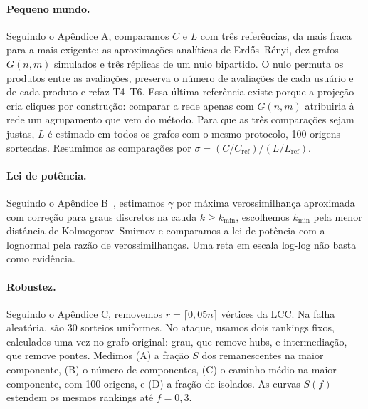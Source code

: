 \documentclass[sigconf,nonacm]{webmedia}
\begin{document}
\paragraph{Pequeno mundo.}
Seguindo o Apêndice A, comparamos \(C\) e \(L\) com três
referências, da mais fraca para a mais exigente: as aproximações
analíticas de Erdős--Rényi, dez grafos \(G(n,m)\) simulados e três
réplicas de um nulo bipartido. O nulo permuta os produtos entre as
avaliações, preserva o número de avaliações de cada usuário e de cada
produto e refaz T4--T6. Essa última referência existe porque a
projeção cria cliques por construção: comparar a rede apenas com
\(G(n,m)\) atribuiria à rede um agrupamento que vem do método. Para
que as três comparações sejam justas, \(L\) é estimado em todos os
grafos com o mesmo protocolo, 100 origens sorteadas. Resumimos as
comparações por \(\sigma=(C/C_{\mathrm{ref}})/(L/L_{\mathrm{ref}})\).

\paragraph{Lei de potência.}
Seguindo o Apêndice B~\cite{barabasi2016}, estimamos \(\gamma\)
por máxima verossimilhança aproximada com correção para graus discretos na cauda \(k\geq k_{\min}\),
escolhemos \(k_{\min}\) pela menor distância de Kolmogorov--Smirnov e
comparamos a lei de potência com a lognormal pela razão de
verossimilhanças. Uma reta em escala log-log
não basta como evidência.

\paragraph{Robustez.}
Seguindo o Apêndice C, removemos \(r=\lceil0{,}05n\rceil\) vértices da
LCC. Na falha aleatória, são 30 sorteios uniformes. No ataque, usamos
dois rankings fixos, calculados uma vez no grafo original: grau, que
remove hubs, e intermediação, que remove pontes. Medimos (A) a fração
\(S\) dos remanescentes na maior componente, (B) o número de
componentes, (C) o caminho médio na maior componente, com 100
origens, e (D) a fração de isolados. As curvas \(S(f)\) estendem os
mesmos rankings até \(f=0{,}3\).
\end{document}
